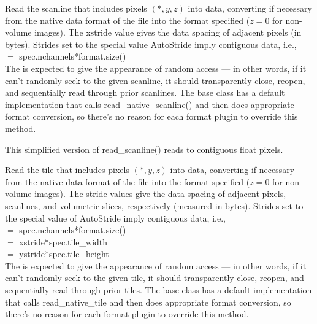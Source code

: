 
Read the scanline that includes pixels $(*,y,z)$ into {\kw data},
converting if necessary from the native data format of the file into the
{\kw format} specified ($z=0$ for non-volume images).  The {\kw xstride}
value gives the data spacing of adjacent pixels (in bytes).  Strides set
to the special value {\kw AutoStride} imply contiguous data, i.e., \\
   $=$ {\kw spec.nchannels*format.size()} \\
The \ImageInput is expected to give the appearance of random access
--- in other words, if it can't randomly seek to the given scanline, it
should transparently close, reopen, and sequentially read through prior
scanlines.  The base \ImageInput class has a default implementation
that calls {\kw read_native_scanline()} and then does appropriate format
conversion, so there's no reason for each format plugin to override this
method.
\apiend

This simplified version of {\kw read_scanline()} reads to contiguous 
float pixels.
\apiend

Read the tile that includes pixels $(*,y,z)$ into {\kw data}, converting
if necessary from the native data format of the file into the 
{\kw format} specified ($z=0$ for non-volume images).  The stride values
give the data spacing of adjacent pixels, scanlines, and volumetric
slices, respectively (measured in bytes).  Strides set to the special
value of {\kw AutoStride} imply contiguous data, i.e., \\
 $=$ {\kw spec.nchannels*format.size()} \\
 $=$ {\kw xstride*spec.tile_width} \\
 $=$ {\kw ystride*spec.tile_height} \\
The \ImageInput is expected to give the appearance of random access
--- in other words, if it can't randomly seek to the given tile, it
should transparently close, reopen, and sequentially read through prior
tiles.  The base \ImageInput class has a default implementation
that calls read_native_tile and then does appropriate format conversion,
so there's no reason for each format plugin to override this method.
\apiend


